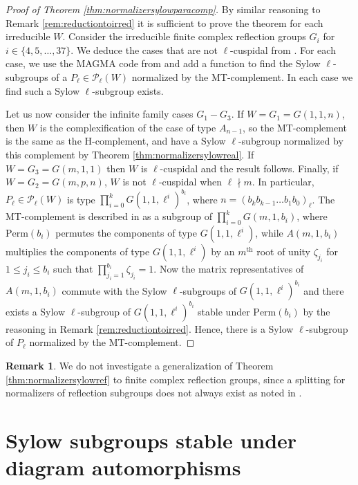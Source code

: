 \documentclass[12pt]{amsart}
\theoremstyle{plain}
\theoremstyle{definition}
\newtheorem{remark}[theorem]{Remark}
\numberwithin{equation}{section}
\numberwithin{equation}{section}
\begin{document}
	
	\begin{proof}[Proof of Theorem \ref{thm:normalizersylowparacomp}]
		By similar reasoning to Remark \ref{rem:reductiontoirred} it is sufficient to prove the theorem for each irreducible $W$. Consider the irreducible finite complex reflection groups $G_i$ for $i\in\{4,5,\dots,37\}$. We deduce the cases that are not $\ell$-cuspidal from \cite[Table 1]{METOO}. For each case, we use the MAGMA code from \cite{MURA} and add a function to find the Sylow $\ell$-subgroups of a $P_\ell\in\mathcal{P}_\ell(W)$ normalized by the MT-complement. In each case we find such a Sylow $\ell$-subgroup exists.
		
		Let us now consider the infinite family cases $G_1-G_3$. If $W=G_1= G(1,1,n)$, then $W$ is the complexification of the case of type $A_{n-1}$, so the MT-complement is the same as the H-complement, and have a Sylow $\ell$-subgroup normalized by this complement by Theorem \ref{thm:normalizersylowreal}. If $W=G_3= G(m,1,1)$ then $W$ is $\ell$-cuspidal and the result follows. Finally, if $W=G_2= G(m,p,n)$, $W$ is not $\ell$-cuspidal when $\ell\nmid m$. In particular, $P_\ell\in\mathcal{P}_\ell(W)$ is type $\prod_{i=0}^{k}G(1,1,\ell^i)^{b_i}$, where $n=(b_kb_{k-1}\dots b_1b_0)_\ell$. The MT-complement is described in \cite[Theorem 3.12 (iii)]{MURA} as a subgroup of $\prod_{i=0}^{k}G(m,1,b_i)$, where $\text{Perm}(b_i)$ permutes the components of type $G(1,1,\ell^i)$, while $A(m,1,b_i)$ multiplies the components of type $G(1,1,\ell^i)$ by an $m^{\text{th}}$ root of unity $\zeta_{j_i}$ for $1\leq j_i\leq b_i$ such that $\prod_{j_i=1}^{b_i}{\zeta_{j_i}}=1$. Now the matrix representatives of $A(m,1,b_i)$ commute with the Sylow $\ell$-subgroups of $G(1,1,\ell^i)^{b_i}$ and there exists a Sylow $\ell$-subgroup of $G(1,1,\ell^i)^{b_i}$ stable under $\text{Perm}(b_i)$ by the reasoning in Remark \ref{rem:reductiontoirred}. Hence, there is a Sylow $\ell$-subgroup of $P_\ell$ normalized by the MT-complement.
	\end{proof}
	
	\begin{remark}
		We do not investigate a generalization of Theorem \ref{thm:normalizersylowref} to finite complex reflection groups, since a splitting for normalizers of reflection subgroups does not always exist as noted in \cite[Example 6.1]{GHM3}.
	\end{remark}
	
	
	
	
	
	\section{Sylow subgroups stable under diagram automorphisms}\label{complexdiagramsproof}
	
\end{document}
